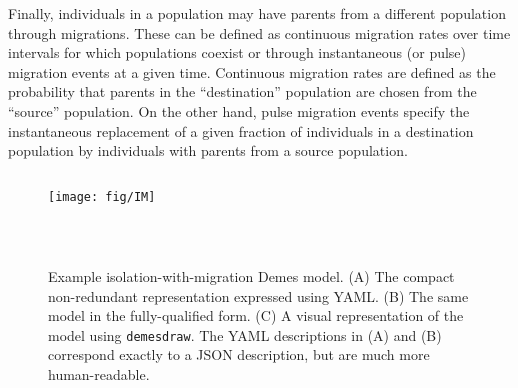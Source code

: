 \documentclass[11pt]{article}
\begin{document}
Finally, individuals in a population may have parents from a different
population through migrations. These can be defined as continuous migration
rates over time intervals for which populations coexist or through
instantaneous (or pulse) migration events at a given time. Continuous migration
rates are defined as the probability that parents in the ``destination''
population are chosen from the ``source'' population.
On the other hand, pulse
migration events specify the instantaneous replacement of a given fraction of
individuals in a destination population by individuals with parents from a
source population.

\begin{figure}
\begin{minipage}{0.44\textwidth}
\begin{tcolorbox}
\inputminted[fontsize=\scriptsize,linenos,numbersep=5pt]{yaml}{models/IM.yaml}
\end{tcolorbox}
\begin{tcolorbox}
\texttt{[image: fig/IM]}
\end{tcolorbox}
\end{minipage}\hfill
\begin{minipage}{0.54\textwidth}
\begin{tcolorbox}
\inputminted[fontsize=\scriptsize,linenos,numbersep=5pt]{yaml}{models/IM-resolved.yaml}
\end{tcolorbox}
\end{minipage}\\
\caption{\label{fig-example}
Example isolation-with-migration Demes model. (A) The compact non-redundant
representation expressed using YAML. (B) The same model in the fully-qualified
form. (C) A visual representation of the model using \texttt{demesdraw}.
The YAML descriptions in (A) and (B) correspond exactly to a JSON description,
but are much more human-readable.
}
\end{figure}
\end{document}
